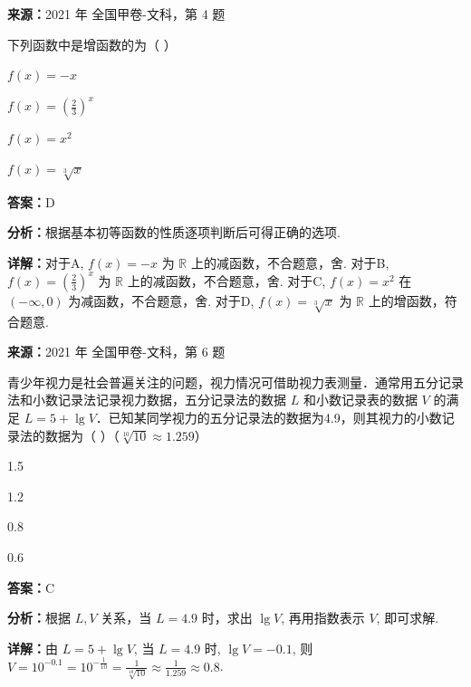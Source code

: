 \begin{question}[points=5]
\textbf{来源：}2021 年 全国甲卷-文科，第 4 题\par
下列函数中是增函数的为（ ）
\begin{choices}
  \item $f(x) = -x$
  \item $f(x) = \left(\frac{2}{3}\right)^x$
  \item $f(x) = x^2$
  \item $f(x) = \sqrt[3]{x}$
\end{choices}
\begin{solution}
\textbf{答案：}D

\textbf{分析：}根据基本初等函数的性质逐项判断后可得正确的选项.

\textbf{详解：}对于A, $f(x)=-x$ 为 $\mathbb{R}$ 上的减函数，不合题意，舍.
对于B, $f(x)=\left(\frac{2}{3}\right)^x$ 为 $\mathbb{R}$ 上的减函数，不合题意，舍.
对于C, $f(x)=x^2$ 在 $(-\infty,0)$ 为减函数，不合题意，舍.
对于D, $f(x)=\sqrt[3]{x}$ 为 $\mathbb{R}$ 上的增函数，符合题意.
\end{solution}
\end{question}

\begin{question}[points=5]
\textbf{来源：}2021 年 全国甲卷-文科，第 6 题\par
青少年视力是社会普遍关注的问题，视力情况可借助视力表测量．通常用五分记录法和小数记录法记录视力数据，五分记录法的数据 $L$ 和小数记录表的数据 $V$ 的满足 $L = 5 + \lg V$．已知某同学视力的五分记录法的数据为4.9，则其视力的小数记录法的数据为（ ）（$\sqrt[10]{10} \approx 1.259$）
\begin{choices}
  \item 1.5
  \item 1.2
  \item 0.8
  \item 0.6
\end{choices}
\begin{solution}
\textbf{答案：}C

\textbf{分析：}根据 $L,V$ 关系，当 $L=4.9$ 时，求出 $\lg V$, 再用指数表示 $V$, 即可求解.

\textbf{详解：}由 $L=5+\lg V$, 当 $L=4.9$ 时, $\lg V = -0.1$, 则 $V = 10^{-0.1} = 10^{-\frac{1}{10}} = \frac{1}{\sqrt[10]{10}} \approx \frac{1}{1.259} \approx 0.8$.
\end{solution}
\end{question}

